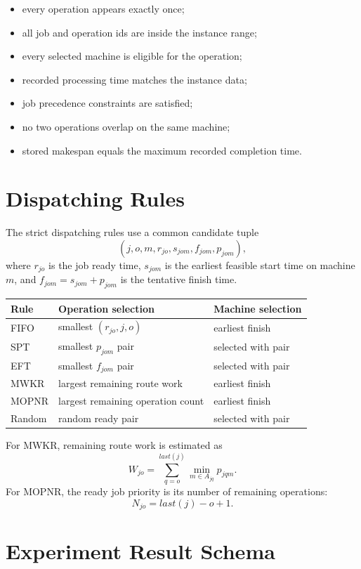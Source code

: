 ﻿\documentclass[11pt]{article}
\begin{document}
\begin{itemize}
  \item every operation appears exactly once;
  \item all job and operation ids are inside the instance range;
  \item every selected machine is eligible for the operation;
  \item recorded processing time matches the instance data;
  \item job precedence constraints are satisfied;
  \item no two operations overlap on the same machine;
  \item stored makespan equals the maximum recorded completion time.
\end{itemize}

\section{Dispatching Rules}

The strict dispatching rules use a common candidate tuple
\[
(j,o,m,r_{jo},s_{jom},f_{jom},p_{jom}),
\]
where $r_{jo}$ is the job ready time, $s_{jom}$ is the earliest feasible start
time on machine $m$, and $f_{jom}=s_{jom}+p_{jom}$ is the tentative finish time.

\begin{table}[h]
\centering
\begin{tabular}{lll}
\toprule
Rule & Operation selection & Machine selection \\
\midrule
FIFO & smallest $(r_{jo},j,o)$ & earliest finish \\
SPT & smallest $p_{jom}$ pair & selected with pair \\
EFT & smallest $f_{jom}$ pair & selected with pair \\
MWKR & largest remaining route work & earliest finish \\
MOPNR & largest remaining operation count & earliest finish \\
Random & random ready pair & selected with pair \\
\bottomrule
\end{tabular}
\end{table}

For MWKR, remaining route work is estimated as
\[
W_{jo} = \sum_{q=o}^{last(j)} \min_{m \in A_{jq}} p_{jqm}.
\]
For MOPNR, the ready job priority is its number of remaining operations:
\[
N_{jo} = last(j) - o + 1.
\]

\section{Experiment Result Schema}
\end{document}
